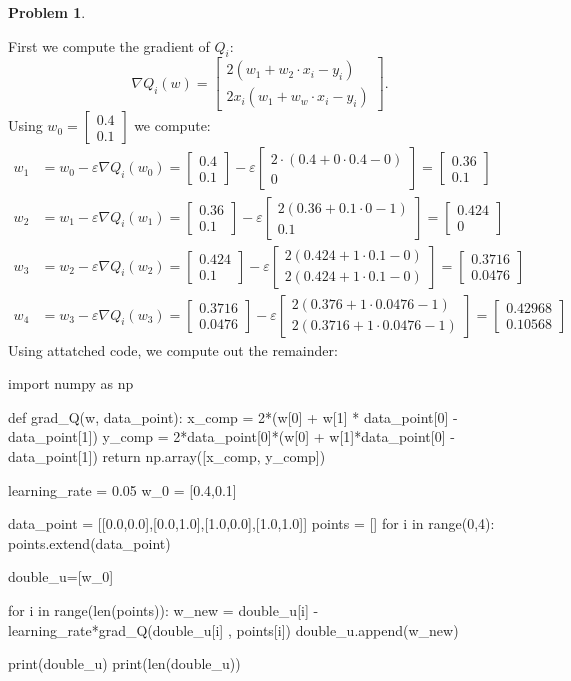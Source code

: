 \documentclass[12pt, a4paper]{article}
\title{}
\author{A.N.}
\date{\today}
\newtheorem{problem}{Problem}
\theoremstyle{definition}
\newcommand{\grad}{\nabla}
\newcommand{\ep}{\varepsilon}
\newcommand{\bmat}[1]{\begin{bmatrix}#1\end{bmatrix}}
\begin{document}
\begin{problem}
\end{problem}
First we compute the gradient of $Q_i$: 
$$ \grad Q_i(w) = \bmat{2(w_1 + w_2 \cdot x_i - y_i ) \\ 2x_i(w_1 + w_w \cdot x_i - y_i)} .$$
Using $w_0 = \bmat{0.4 \\ 0.1}$ we compute: 
\begin{align*}
	w_1 & = w_0 - \ep\grad Q_i(w_0) = \bmat{0.4 \\ 0.1} - \ep \bmat{ 2 \cdot (0.4+ 0 \cdot 0.4 - 0) \\ 0} = \bmat{0.36 \\ 0.1} 
	\\ w_2 & = w_1 - \ep \grad Q_i ( w_1) = \bmat{0.36 \\ 0.1 } - \ep \bmat{2(0.36 + 0.1 \cdot 0 - 1) \\ 0.1}  = \bmat{0.424 \\ 0}
	\\ w_3 & = w_2 -\ep \grad Q_i (w_2) = \bmat{0.424 \\ 0.1 } - \ep \bmat{2 ( 0.424 + 1 \cdot 0.1 - 0) \\ 2(0.424 + 1 \cdot 0.1 - 0)} = \bmat{0.3716 \\ 0.0476}
	\\ w_4 & = w_3 - \ep \grad Q_i (w_3)  = \bmat{0.3716 \\ 0.0476} - \ep \bmat{2 (0.376 + 1 \cdot 0.0476  - 1) \\ 2 (0.3716 + 1 \cdot 0.0476 - 1)} = \bmat{0.42968 \\ 0.10568}
\end{align*}
Using attatched code, we compute out the remainder: 
\begin{python}
	import numpy as np

def grad_Q(w, data_point):
    x_comp = 2*(w[0] + w[1] * data_point[0] - data_point[1])
    y_comp = 2*data_point[0]*(w[0] + w[1]*data_point[0] - data_point[1])
    return np.array([x_comp, y_comp])

learning_rate = 0.05
w_0 = [0.4,0.1]

data_point = [[0.0,0.0],[0.0,1.0],[1.0,0.0],[1.0,1.0]]
points = []
for i in range(0,4):
    points.extend(data_point)

double_u=[w_0]

for i in range(len(points)):
    w_new = double_u[i] - learning_rate*grad_Q(double_u[i] , points[i])
    double_u.append(w_new)

print(double_u)
print(len(double_u))
\end{python}
\end{document}
